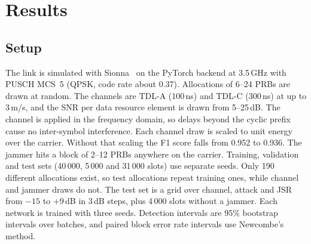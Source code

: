 \documentclass[conference]{IEEEtran}
\begin{document}
\section{Results}
\label{sec:results}

\subsection{Setup}
The link is simulated with Sionna~\cite{hoydis2022sionna,nvidia2026sionna} on the PyTorch backend
at 3.5\,GHz with PUSCH MCS~5 (QPSK, code rate about 0.37). Allocations of 6--24 PRBs are drawn at
random. The channels are TDL-A (100\,ns) and TDL-C (300\,ns) at up to 3\,m/s, and the SNR per data
resource element is drawn from 5--25\,dB. The channel is applied in the frequency domain, so delays
beyond the cyclic prefix cause no inter-symbol interference. Each channel draw is scaled to unit
energy over the carrier. Without that scaling the F1 score falls from 0.952 to 0.936. The jammer
hits a block of 2--12 PRBs anywhere on the carrier. Training, validation and test sets (40\,000,
5\,000 and 31\,000 slots) use separate seeds. Only 190 different allocations exist, so test
allocations repeat training ones, while channel and jammer draws do not. The test set is a grid
over channel, attack and JSR from $-15$ to $+9$\,dB in 3\,dB steps, plus 4\,000 slots without a
jammer. Each network is trained with three seeds. Detection intervals are 95\% bootstrap intervals
over batches, and paired block error rate intervals use Newcombe's method.
\end{document}
